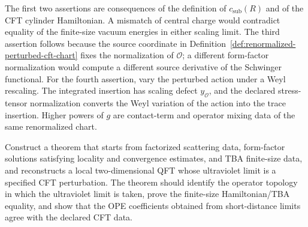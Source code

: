 The first two assertions are consequences of the definition of
\(c_{\mathrm{sub}}(R)\) and of the CFT cylinder Hamiltonian.  A mismatch of
central charge would contradict equality of the finite-size vacuum energies
in either scaling limit.  The third assertion follows because the source
coordinate in Definition~\ref{def:renormalized-perturbed-cft-chart} fixes the
normalization of \(\mathcal O\); a different form-factor normalization would
compute a different source derivative of the Schwinger functional.  For the
fourth assertion, vary the perturbed action under a Weyl rescaling.  The
integrated insertion has scaling defect \(y_{\mathcal O}\), and the declared
stress-tensor normalization converts the Weyl variation of the action into
the trace insertion.  Higher powers of \(g\) are contact-term and operator
mixing data of the same renormalized chart.

\begin{openproblem}
\label{op:integrable-flow-reconstruction}
Construct a theorem that starts from factorized scattering data, form-factor
solutions satisfying locality and convergence estimates, and TBA finite-size
data, and reconstructs a local two-dimensional QFT whose ultraviolet limit is
a specified CFT perturbation.  The theorem should identify the operator
topology in which the ultraviolet limit is taken, prove the finite-size
Hamiltonian/TBA equality, and show that the OPE coefficients obtained from
short-distance limits agree with the declared CFT data.
\end{openproblem}
